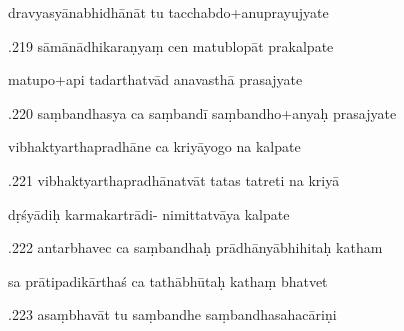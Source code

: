 \documentclass[article,12pt,a4paper]{memoir}%
\newcounter{parCount}
\begin{document}
	  
	  \pstart \leavevmode%
	dravyasyānabhidhānāt tu tacchabdo+anuprayujyate 
	{}
	\pend%
      

	  
	  \pstart {}.219 sāmānādhikaraṇyaṃ cen matublopāt prakalpate 
	{}
	\pend%
      

	  
	  \pstart \leavevmode%
	matupo+api tadarthatvād anavasthā prasajyate 
	{}
	\pend%
      

	  
	  \pstart {}.220 saṃbandhasya ca saṃbandī saṃbandho+anyaḥ prasajyate 
	{}
	\pend%
      

	  
	  \pstart \leavevmode%
	vibhaktyarthapradhāne ca kriyāyogo na kalpate 
	{}
	\pend%
      

	  
	  \pstart {}.221 vibhaktyarthapradhānatvāt tatas tatreti na kriyā 
	{}
	\pend%
      

	  
	  \pstart \leavevmode%
	dṛśyādiḥ karmakartrādi- nimittatvāya kalpate 
	{}
	\pend%
      

	  
	  \pstart {}.222 antarbhavec ca saṃbandhaḥ   prādhānyābhihitaḥ katham 
	{}
	\pend%
      

	  
	  \pstart \leavevmode%
	sa prātipadikārthaś ca tathābhūtaḥ kathaṃ bhatvet 
	{}
	\pend%
      

	  
	  \pstart {}.223 asaṃbhavāt tu saṃbandhe   saṃbandhasahacāriṇi 
	{}
	\pend%
      
\end{document}
